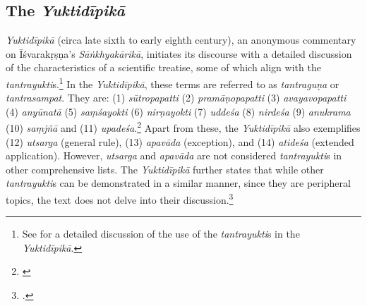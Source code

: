 \subsection{The \emph{Yuktidīpikā}} 
\emph{Yuktidīpikā} (circa late sixth to early eighth century), an anonymous 
commentary on Īśvarakṛṣṇa's \emph{Sāṅkhyakārikā}, initiates its discourse with 
a 
detailed discussion of the characteristics of a scientific treatise, some of which 
align 
with the \emph{tantrayukti}s.\footnote{See \cite[605--614]{ober-1968} for a 
detailed discussion of the use of the \emph{tantrayukti}s in the 
\emph{Yuktidīpikā}.} 
In the \emph{Yuktidīpikā}, these terms are referred to as \emph{tantraguṇa} or 
\emph{tantrasampat}. They are: (1) \emph{sūtropapatti} (2) 
\emph{pramāṇopapatti} (3) \emph{avayavopapatti} (4) \emph{anyūnatā} (5) 
\emph{saṃśayokti} (6) \emph{nirṇayokti} (7) \emph{uddeśa} (8) 
\emph{nirdeśa} (9) \emph{anukrama} (10) \emph{saṃjñā} and (11) 
\emph{upadeśa}.\footnote{
	\begin{verse}
	\end{verse}
\cite[3]{wezl-1998}}
Apart from these, the \emph{Yuktidīpikā} also exemplifies (12) \emph{utsarga} 
(general 
rule), (13) \emph{apavāda} (exception), and (14) \emph{atideśa} (extended 
application). 
However, \emph{utsarga} and \emph{apavāda} are not considered 
\emph{tantrayukti}s in 
other comprehensive lists. The \emph{Yuktidīpikā} further states that while 
other 
\emph{tantrayukti}s can be demonstrated in a similar manner, since they are 
peripheral 
topics, the text does not delve into their discussion.\footnote{.\cite[8]{wezl-1998}} 

